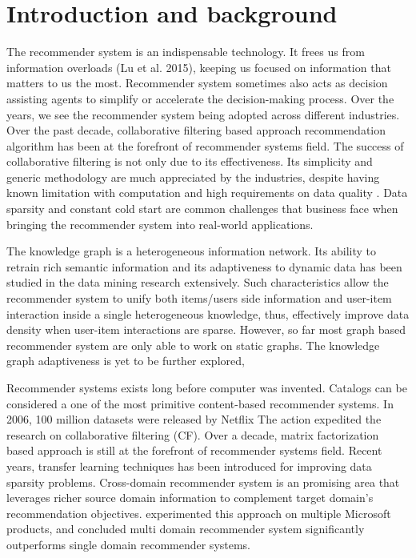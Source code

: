 
\section{Introduction and background}
The recommender system is an indispensable technology. It frees us from information overloads (Lu et al. 2015), keeping us focused on information that matters to us the most. Recommender system sometimes also acts as decision assisting agents to simplify or accelerate the decision-making process. Over the years, we see the recommender system being adopted across different industries. Over the past decade, collaborative filtering based approach recommendation algorithm has been at the forefront of recommender systems field. 
The success of collaborative filtering is not only due to its effectiveness. Its simplicity and generic methodology are much appreciated by the industries, despite having known limitation with computation and high requirements on data quality \citep{Amatriain2016}. Data sparsity and constant cold start are common challenges that business face when bringing the recommender system into real-world applications. 

The knowledge graph is a heterogeneous information network. Its ability to retrain rich semantic information and its adaptiveness to dynamic data has been studied in the data mining research \citep{Song2019} extensively. Such characteristics allow the recommender system to unify both items/users side information and user-item interaction inside a single heterogeneous knowledge, thus, effectively improve data density when user-item interactions are sparse. However, so far most graph based recommender system are only able to work on static graphs. The knowledge graph adaptiveness is yet to be further explored, 

Recommender systems exists long before computer was invented. Catalogs can be considered a one of the most primitive content-based recommender systems. In 2006, 100 million datasets were released by Netflix \citep{Bennett2007} The action expedited the research on collaborative filtering (CF). Over a decade, matrix factorization based approach is still at the forefront of recommender systems field. 
Recent years, transfer learning \citep{Pan2010} techniques has been introduced for improving data sparsity problems. Cross-domain recommender system is an promising area that leverages richer source domain information to complement target domain's recommendation objectives. \citet{Elkahky2015} experimented this approach on multiple Microsoft products, and concluded multi domain recommender system significantly outperforms single domain recommender systems.  

